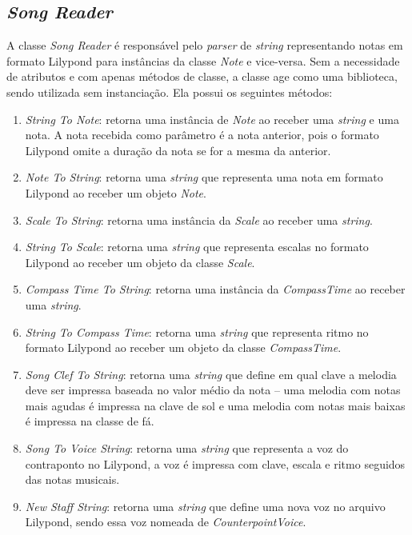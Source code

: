     \subsection[\textit{Song Reader}]{\textit{Song Reader}}


      A classe \textit{Song Reader} é responsável pelo \textit{parser} de \textit{string} representando notas em formato Lilypond para instâncias da classe \textit{Note} e vice-versa. Sem a necessidade de atributos e com apenas métodos de classe, a classe age como uma biblioteca, sendo utilizada sem instanciação. Ela possui os seguintes métodos:


      \begin{enumerate}
        \item \textit{String To Note}: retorna uma instância de \textit{Note} ao receber uma \textit{string} e uma nota. A nota recebida como parâmetro é a nota anterior, pois o formato Lilypond omite a duração da nota se for a mesma da anterior.
        \item \textit{Note To String}: retorna uma \textit{string} que representa uma nota em formato Lilypond ao receber um objeto \textit{Note}.
        \item \textit{Scale To String}: retorna uma instância da \textit{Scale} ao receber uma \textit{string}.
        \item \textit{String To Scale}: retorna uma \textit{string} que representa escalas no formato Lilypond ao receber um objeto da classe \textit{Scale}.
        \item \textit{Compass Time To String}: retorna uma instância da \textit{CompassTime} ao receber uma \textit{string}.
        \item \textit{String To Compass Time}: retorna uma \textit{string} que representa ritmo no formato Lilypond ao receber um objeto da classe \textit{CompassTime}.
        \item \textit{Song Clef To String}: retorna uma \textit{string} que define em qual clave a melodia deve ser impressa baseada no valor médio da nota -- uma melodia com notas mais agudas é impressa na clave de sol e uma melodia com notas mais baixas é impressa na classe de fá.
        \item \textit{Song To Voice String}: retorna uma \textit{string} que representa a voz do contraponto no Lilypond, a voz é impressa com clave, escala e ritmo seguidos das notas musicais.
        \item \textit{New Staff String}: retorna uma \textit{string} que define uma nova voz no arquivo Lilypond, sendo essa voz nomeada de \textit{CounterpointVoice}.

\end{enumerate}
